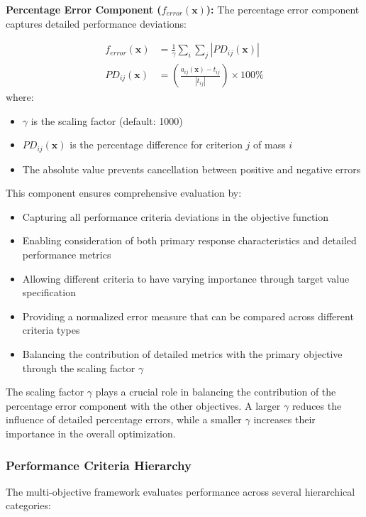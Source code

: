 \documentclass[12pt,a4paper]{article}
\begin{document}
\textbf{Percentage Error Component ($f_{error}(\mathbf{x})$):} The percentage error component captures detailed performance deviations:

\begin{align}\label{Eq.percentage_error_detailed}
f_{error}(\mathbf{x}) &= \frac{1}{\gamma} \sum_{i} \sum_{j} \left| PD_{ij}(\mathbf{x}) \right|\\
PD_{ij}(\mathbf{x}) &= \left( \frac{a_{ij}(\mathbf{x}) - t_{ij}}{|t_{ij}|} \right) \times 100\%
\end{align}
where:
\begin{itemize}
    \item $\gamma$ is the scaling factor (default: 1000)
    \item $PD_{ij}(\mathbf{x})$ is the percentage difference for criterion $j$ of mass $i$
    \item The absolute value prevents cancellation between positive and negative errors
\end{itemize}

This component ensures comprehensive evaluation by:
\begin{itemize}
    \item Capturing all performance criteria deviations in the objective function
    \item Enabling consideration of both primary response characteristics and detailed performance metrics
    \item Allowing different criteria to have varying importance through target value specification
    \item Providing a normalized error measure that can be compared across different criteria types
    \item Balancing the contribution of detailed metrics with the primary objective through the scaling factor $\gamma$
\end{itemize}

The scaling factor $\gamma$ plays a crucial role in balancing the contribution of the percentage error component with the other objectives. A larger $\gamma$ reduces the influence of detailed percentage errors, while a smaller $\gamma$ increases their importance in the overall optimization.

\subsubsection{Performance Criteria Hierarchy}
The multi-objective framework evaluates performance across several hierarchical categories:
\end{document}
